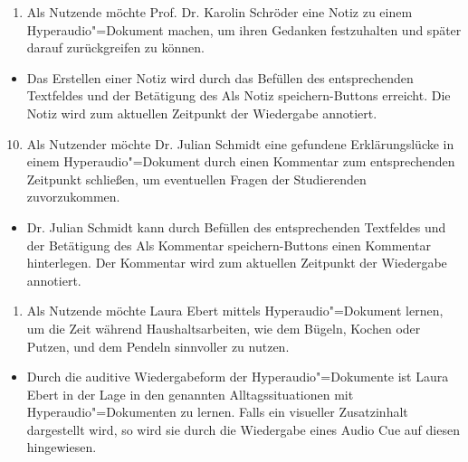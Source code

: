 \vspace{0.25cm}
\begin{enumerate}[resume*]
\item \label{US-Notiz-L-Eval} Als Nutzende möchte Prof. Dr. Karolin Schröder eine Notiz zu einem Hyperaudio"=Dokument machen, um ihren Gedanken festzuhalten und später darauf zurückgreifen zu können.
\end{enumerate}
\vspace{-0.1cm}
\begin{itemize}
\item[\Checkmark]
Das Erstellen einer Notiz wird durch das Befüllen des entsprechenden Textfeldes und der Betätigung des \glqq Als Notiz speichern\grqq{}-Buttons erreicht. Die Notiz wird zum aktuellen Zeitpunkt der Wiedergabe annotiert.
\end{itemize}
\vspace{0.25cm}
\begin{enumerate}[leftmargin=1.3cm,label=US-\arabic*:,ref=US-\arabic*]
\setcounter{enumi}{9}
\item \label{US-Kommentar-L-Eval} Als Nutzender möchte Dr. Julian Schmidt eine gefundene Erklärungslücke in einem Hyperaudio"=Dokument durch einen Kommentar zum entsprechenden Zeitpunkt schließen, um eventuellen Fragen der Studierenden zuvorzukommen.
\end{enumerate}
\vspace{-0.25cm}
\begin{itemize}
\item[\Checkmark]
Dr. Julian Schmidt kann durch Befüllen des entsprechenden Textfeldes und der Betätigung des \glqq Als Kommentar speichern\grqq{}-Buttons einen Kommentar hinterlegen. Der Kommentar wird zum aktuellen Zeitpunkt der Wiedergabe annotiert.
\end{itemize}
\vspace{0.25cm}
\begin{enumerate}[resume*]
\item \label{US-Zeit-Eval} Als Nutzende möchte Laura Ebert mittels Hyperaudio"=Dokument lernen, um die Zeit während Haushaltsarbeiten, wie dem Bügeln, Kochen oder Putzen, und dem Pendeln sinnvoller zu nutzen.
\end{enumerate}
\vspace{-0.1cm}
\begin{itemize}
\item[\Checkmark]
Durch die auditive Wiedergabeform der Hyperaudio"=Dokumente ist Laura Ebert in der Lage in den genannten Alltagssituationen mit Hyperaudio"=Dokumenten zu lernen. Falls ein visueller Zusatzinhalt dargestellt wird, so wird sie durch die Wiedergabe eines Audio Cue auf diesen hingewiesen.
\end{itemize}
